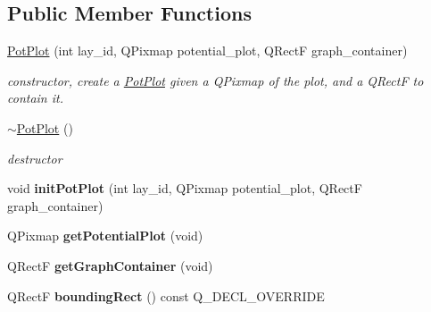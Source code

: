 \subsection*{Public Member Functions}
\begin{DoxyCompactItemize}
\item 
\hyperlink{classprim_1_1PotPlot_a23898d51dd311b49465e3d3602e438da}{Pot\+Plot} (int lay\+\_\+id, Q\+Pixmap potential\+\_\+plot, Q\+RectF graph\+\_\+container)\hypertarget{classprim_1_1PotPlot_a23898d51dd311b49465e3d3602e438da}{}\label{classprim_1_1PotPlot_a23898d51dd311b49465e3d3602e438da}

\begin{DoxyCompactList}\small\item\em constructor, create a \hyperlink{classprim_1_1PotPlot}{Pot\+Plot} given a Q\+Pixmap of the plot, and a Q\+RectF to contain it. \end{DoxyCompactList}\item 
\hyperlink{classprim_1_1PotPlot_a78ba7aee47b86e8bbb52e4acdaa112f1}{$\sim$\+Pot\+Plot} ()\hypertarget{classprim_1_1PotPlot_a78ba7aee47b86e8bbb52e4acdaa112f1}{}\label{classprim_1_1PotPlot_a78ba7aee47b86e8bbb52e4acdaa112f1}

\begin{DoxyCompactList}\small\item\em destructor \end{DoxyCompactList}\item 
void {\bfseries init\+Pot\+Plot} (int lay\+\_\+id, Q\+Pixmap potential\+\_\+plot, Q\+RectF graph\+\_\+container)\hypertarget{classprim_1_1PotPlot_a474b943cb91ed3820669efdc6e822f8f}{}\label{classprim_1_1PotPlot_a474b943cb91ed3820669efdc6e822f8f}

\item 
Q\+Pixmap {\bfseries get\+Potential\+Plot} (void)\hypertarget{classprim_1_1PotPlot_a3d9255012b7de62b1947b1f19a92a0b0}{}\label{classprim_1_1PotPlot_a3d9255012b7de62b1947b1f19a92a0b0}

\item 
Q\+RectF {\bfseries get\+Graph\+Container} (void)\hypertarget{classprim_1_1PotPlot_ae63d60ebdfd993ac0d53f8cb8e277458}{}\label{classprim_1_1PotPlot_ae63d60ebdfd993ac0d53f8cb8e277458}

\item 
Q\+RectF {\bfseries bounding\+Rect} () const Q\+\_\+\+D\+E\+C\+L\+\_\+\+O\+V\+E\+R\+R\+I\+DE\hypertarget{classprim_1_1PotPlot_a22d26526ecc41fa4d01a00b545170d19}{}\label{classprim_1_1PotPlot_a22d26526ecc41fa4d01a00b545170d19}


\end{DoxyCompactItemize}
